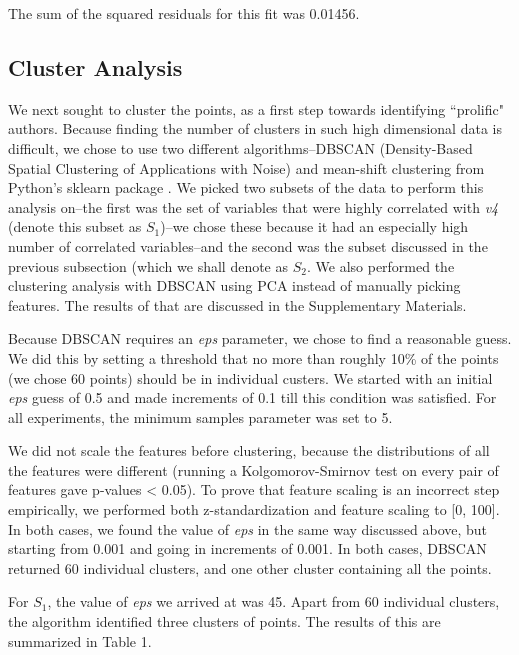 \documentclass[12pt,a4paper,twocolumn]{article}
\begin{document}
	The sum of the squared residuals for this fit was 0.01456.
	
	\subsection{Cluster Analysis}
	We next sought to cluster the points, as a first step towards identifying ``prolific" authors. Because finding the number of clusters in such high dimensional data is difficult, we chose to use two different algorithms--DBSCAN (Density-Based Spatial Clustering of Applications with Noise)\cite{ester1996density} and mean-shift clustering \cite{comaniciu2002mean} from Python's sklearn package \cite{scikit-learn}. We picked two subsets of the data to perform this analysis on--the first was the set of variables that were highly correlated with \textit{v4} (denote this subset as $S_1$)--we chose these because it had an especially high number of correlated variables--and the second was the subset discussed in the previous subsection (which we shall denote as $S_2$. We also performed the clustering analysis with DBSCAN using PCA instead of manually picking features. The results of that are discussed in the Supplementary Materials.
	
	Because DBSCAN requires an \textit{eps} parameter, we chose to find a reasonable guess. We did this by setting a threshold that no more than roughly 10\% of the points (we chose 60 points) should be in individual custers. We started with an initial \textit{eps} guess of 0.5 and made increments of 0.1 till this condition was satisfied. For all experiments, the minimum samples parameter was set to 5.
	
	We did not scale the features before clustering, because the distributions of all the features were different (running a Kolgomorov-Smirnov test on every pair of features gave p-values < 0.05). To prove that feature scaling is an incorrect step empirically, we performed both z-standardization and feature scaling to [0, 100]. In both cases, we found the value of \textit{eps} in the same way discussed above, but starting from 0.001 and going in increments of 0.001. In both cases, DBSCAN returned 60 individual clusters, and one other cluster containing all the points.
	
	For $S_1$, the value of \textit{eps} we arrived at was 45. Apart from 60 individual clusters, the algorithm identified three clusters of points. The results of this are summarized in Table 1. \\
	
\end{document}
